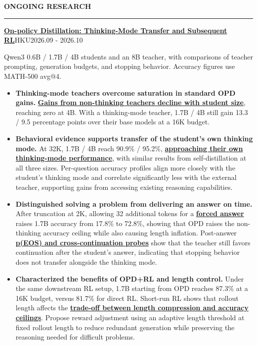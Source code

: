 \documentclass[11pt,a4paper]{article}
\newenvironment{rSection}[1]{
  \Needspace{7\baselineskip}\medskip
  \textbf{#1}\smallskip\hrule\smallskip
}{\par}
\begin{document}
\begin{rSection}{ONGOING RESEARCH}
{\fontsize{10.5}{13.5}\selectfont\textbf{\href{https://rummyyang.github.io/research/opd/opd_deck.html\#1}{\textcolor{researchtitle}{On-policy Distillation: Thinking-Mode Transfer and Subsequent RL}}}\hspace{1.6em}HKU\hfill 2026.09 - 2026.10\par}
Qwen3 0.6B / 1.7B / 4B students and an 8B teacher, with comparisons of teacher prompting, generation budgets, and stopping behavior. Accuracy figures use MATH-500 avg@4.
\begin{itemize}
\item \textbf{Thinking-mode teachers overcome saturation in standard OPD gains.} \textbf{\href{https://rummyyang.github.io/research/opd/opd_deck.html\#7}{\textcolor{researchblue}{Gains from non-thinking teachers decline with student size}}}, reaching zero at 4B. With a thinking-mode teacher, 1.7B / 4B still gain 13.3 / 9.5 percentage points over their base models at a 16K budget.
\item \textbf{Behavioral evidence supports transfer of the student's own thinking mode.} At 32K, 1.7B / 4B reach 90.9\% / 95.2\%, \textbf{\href{https://rummyyang.github.io/research/opd/opd_deck.html\#2}{\textcolor{researchblue}{approaching their own thinking-mode performance}}}, with similar results from self-distillation at all three sizes. Per-question accuracy profiles align more closely with the student's thinking mode and correlate significantly less with the external teacher, supporting gains from accessing existing reasoning capabilities.
\item \textbf{Distinguished solving a problem from delivering an answer on time.} After truncation at 2K, allowing 32 additional tokens for a \textbf{\href{https://rummyyang.github.io/research/opd/opd_deck.html\#3}{\textcolor{researchblue}{forced answer}}} raises 1.7B accuracy from 17.8\% to 72.8\%, showing that OPD raises the non-thinking accuracy ceiling while also causing length inflation. Post-answer \textbf{\href{https://rummyyang.github.io/research/opd/opd_deck.html\#6}{\textcolor{researchblue}{p(EOS) and cross-continuation probes}}} show that the teacher still favors continuation after the student's answer, indicating that stopping behavior does not transfer alongside the thinking mode.
\item \textbf{Characterized the benefits of OPD+RL and length control.} Under the same downstream RL setup, 1.7B starting from OPD reaches 87.3\% at a 16K budget, versus 81.7\% for direct RL. Short-run RL shows that rollout length affects the \textbf{\href{https://rummyyang.github.io/research/opd/opd_deck.html\#5}{\textcolor{researchblue}{trade-off between length compression and accuracy ceilings}}}. Propose reward adjustment using an adaptive length threshold at fixed rollout length to reduce redundant generation while preserving the reasoning needed for difficult problems.
\end{itemize}
\end{rSection}
\end{document}
